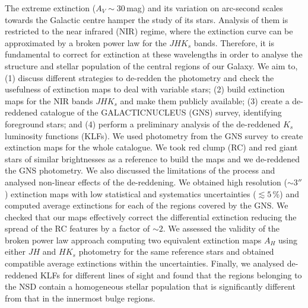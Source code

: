 \documentclass{aa}
\begin{document}
  \abstract
   {The extreme extinction ($A_V\sim30$\,mag) and its variation on arc-second scales towards the Galactic centre hamper the study of its stars.  Analysis of them is restricted to the near infrared (NIR) regime, where the extinction curve can be approximated by a broken power law for the $JHK_s$ bands. Therefore, it is fundamental to correct for extinction at these wavelengths in order to analyse the structure and stellar population of the central regions of our Galaxy.}
   {We aim to, (1) discuss different strategies to de-redden the photometry and check the usefulness of extinction maps to deal with variable stars; (2) build  extinction maps for the NIR bands $JHK_s$ and make them publicly available; (3) create a de-reddened catalogue of the GALACTICNUCLEUS (GNS) survey, identifying foreground stars; and (4) perform a preliminary analysis of the de-reddened $K_s$ luminosity functions (KLFs).}
   {We used photometry from the GNS survey to create extinction maps for the whole catalogue. We took red clump (RC) and red giant stars of similar brightnesses as a reference to build the maps and  we de-reddened the GNS photometry. We also discussed the limitations of the process and analysed non-linear effects of the de-reddening.  
}
{We obtained high resolution ($\sim3''$) extinction maps with low statistical and systematics uncertainties ($\lesssim5$\,\%) and computed average extinctions for each of the regions covered by the GNS. We checked that our maps effectively correct the differential extinction reducing the spread of the RC features by a factor of $\sim2$. We assessed the validity of the broken power law approach computing two equivalent extinction maps $A_H$ using either $JH$ and $HK_s$ photometry for the same reference stars and obtained compatible average extinctions within the uncertainties. Finally, we analysed de-reddened KLFs for different lines of sight and found that the regions belonging to the NSD contain a homogeneous stellar population that is significantly different from that in the innermost bulge regions.}
   
   {}


\end{document}
